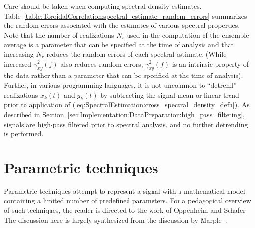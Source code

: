 Care should be taken when computing spectral density estimates.
Table~\ref{table:ToroidalCorrelation:spectral_estimate_random_errors}
summarizes the random errors associated with the estimates
of various spectral properties.
Note that the number of realizations $N_r$ used
in the computation of the ensemble average
is a parameter that can be specified
at the time of analysis and that
increasing $N_r$ reduces the random errors of each spectral estimate.
(While increased $\gamma_{xy}^2(f)$ also reduces random errors,
$\gamma_{xy}^2(f)$ is an intrinsic property of the data
rather than a parameter that can be specified at the time of analysis).
Further, in various programming languages,
it is not uncommon to ``detrend'' realizations $x_k(t)$ and $y_k(t)$
by subtracting the signal mean or linear trend
prior to application of
(\ref{eq:SpectralEstimation:cross_spectral_density_defn}).
As described in
Section~\ref{sec:Implementation:DataPreparation:high_pass_filtering},
signals are high-pass filtered prior to spectral analysis, and
no further detrending is performed.


\section{Parametric techniques}
\label{app:SpectralEstimation:Parametric}
Parametric techniques attempt to represent a signal
with a mathematical model containing
a limited number of predefined parameters.
For a pedagogical overview of such techniques,
the reader is directed to
the work of Oppenheim and Schafer~\cite[Ch.~11]{oppenheim}
The discussion here is largely synthesized
from the discussion by Marple~\cite{marple_ieee89}.

